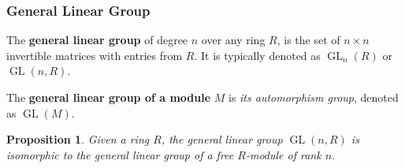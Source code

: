 \documentclass[12pt, letterpaper]{article}
\newcommand{\GL}{\operatorname{GL}}
\newtheorem{prop}{Proposition}[section]
\theoremstyle{definition}
\theoremstyle{remark}
\theoremstyle{definition}
\theoremstyle{plain}
\numberwithin{equation}{section}
\begin{document}
	\subsubsection{General Linear Group}

	
	\begin{def*}
		The \textbf{general linear group} of degree $n$ over any ring $R$, is the set of $n\times n$ invertible matrices with entries from $R$. It is typically denoted as $\GL_n(R)$ or $\GL(n, R)$.
	\end{def*}
	
	\begin{def*}
		The \textbf{general linear group of a module} $M$ is \textit{its automorphism group}, denoted as $\GL(M)$.
	\end{def*}
	
	\begin{prop}
		Given a ring $R$, the general linear group $\GL(n, R)$ is isomorphic to the general linear group of a free $R$-module of rank $n$.
	\end{prop}
	
\end{document}

